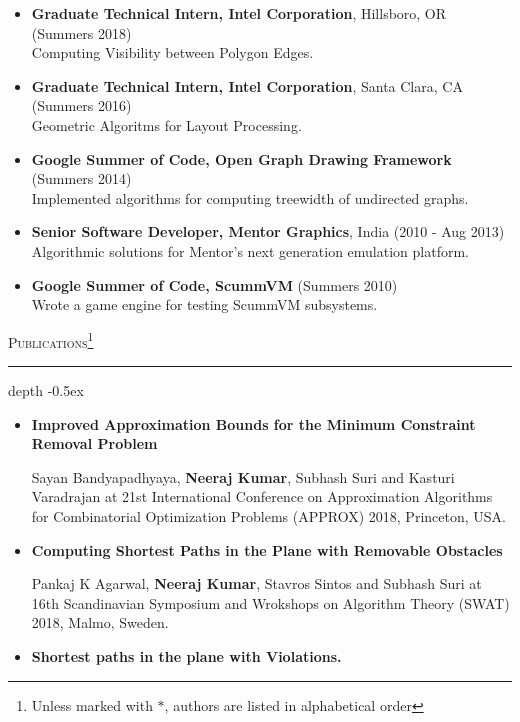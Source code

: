 \documentclass[11pt]{article}
\def\Vhrulefill{\leavevmode\leaders\hrule height 1.2ex depth \dimexpr2pt-0.5ex\hfill\kern0pt}
\begin{document}
{\begin{itemize}
	\item \textbf{Graduate Technical Intern, Intel Corporation}, Hillsboro, OR \hfill(Summers 2018) \\
        Computing Visibility between Polygon Edges.
	
	\item \textbf{Graduate Technical Intern, Intel Corporation}, Santa Clara, CA \hfill(Summers 2016) \\
        Geometric Algoritms for Layout Processing.
	
    \item \textbf{Google Summer of Code, Open Graph Drawing Framework} \hfill(Summers 2014) \\
		Implemented algorithms for computing treewidth of undirected graphs.

	\item \textbf{Senior Software Developer, Mentor Graphics}, India \hfill(2010 - Aug 2013) \\
		Algorithmic solutions for Mentor's next generation emulation platform.
	
	\item \textbf{Google Summer of Code, ScummVM} \hfill(Summers 2010) \\
		Wrote a game engine for testing ScummVM subsystems.
\end{itemize}

\medskip
\noindent\textsc{Publications\footnote{Unless marked with $*$, authors are listed in alphabetical order}}
\textcolor{mygray}{\noindent\Vhrulefill}
\begin{itemize}
    \item \textbf{Improved Approximation Bounds for the Minimum Constraint Removal Problem}
				
				Sayan Bandyapadhyaya,  \textbf{Neeraj Kumar}, Subhash Suri and Kasturi Varadrajan at
				21st International Conference on Approximation Algorithms for Combinatorial Optimization Problems (APPROX) 2018,
				Princeton, USA.


    \item \textbf{Computing Shortest Paths in the Plane with Removable Obstacles}
        
        Pankaj K Agarwal, \textbf{Neeraj Kumar}, Stavros Sintos and Subhash Suri at
				16th Scandinavian Symposium and Wrokshops on Algorithm Theory (SWAT) 2018, Malmo, Sweden.
    
    \item \textbf{Shortest paths in the plane with Violations.}


\end{itemize}}
\end{document}
